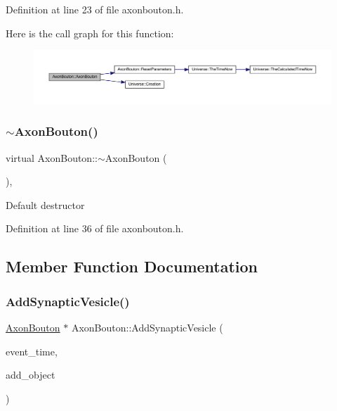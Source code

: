 Definition at line 23 of file axonbouton.\+h.

Here is the call graph for this function\+:\nopagebreak
\begin{figure}[H]
\begin{center}
\leavevmode
\includegraphics[width=350pt]{class_axon_bouton_a6d671fc3b6bd8e617085c1bc7212400d_cgraph}
\end{center}
\end{figure}
\mbox{\label{class_axon_bouton_ab6f93f680d19d4f07476d1d1b3de776a}} 
\subsubsection{\texorpdfstring{$\sim$\+Axon\+Bouton()}{~AxonBouton()}}
{\footnotesize\ttfamily virtual Axon\+Bouton\+::$\sim$\+Axon\+Bouton (\begin{DoxyParamCaption}{ }\end{DoxyParamCaption})\hspace{0.3cm}{\ttfamily [inline]}, {\ttfamily [virtual]}}

Default destructor 

Definition at line 36 of file axonbouton.\+h.



\subsection{Member Function Documentation}
\mbox{\label{class_axon_bouton_a3009e5d49c699afa7f633b026b37ed77}} 
\subsubsection{\texorpdfstring{Add\+Synaptic\+Vesicle()}{AddSynapticVesicle()}}
{\footnotesize\ttfamily \mbox{\hyperlink{class_axon_bouton}{Axon\+Bouton}} $\ast$ Axon\+Bouton\+::\+Add\+Synaptic\+Vesicle (\begin{DoxyParamCaption}\item[{std\+::chrono\+::time\+\_\+point$<$ \mbox{\hyperlink{universe_8h_a0ef8d951d1ca5ab3cfaf7ab4c7a6fd80}{Clock}} $>$}]{event\+\_\+time,  }\item[{\mbox{\hyperlink{class_axon_bouton}{Axon\+Bouton}} $\ast$}]{add\+\_\+object }\end{DoxyParamCaption})}



